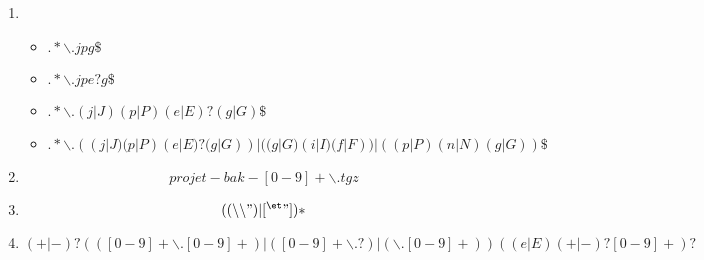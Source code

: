 \begin{enumerate}
\item 
	\begin{itemize} 
		\item $.*\backslash.jpg\$ $
		\item $.*\backslash.jpe?g\$ $
		\item $.*\backslash.(j|J)(p|P)(e|E)?(g|G)\$ $
		\item $.*\backslash.((j|J)(p|P)(e|E)?(g|G))|((g|G)(i|I)(f|F))|((p|P)(n|N)(g|G))\$ $
	\end{itemize}

\item 
	$$ projet-bak-[0-9]+\backslash.tgz $$

\item 
	$$((\backslash\backslash")|[^{\et}"])*$$

\item 
	$$(+|-)? ( ([0-9]+\backslash.[0-9]+) | ([0-9]+\backslash.?) | (\backslash.[0-9]+) ) ((e|E)(+|-)?[0-9]+)?$$
	
\end{enumerate}


